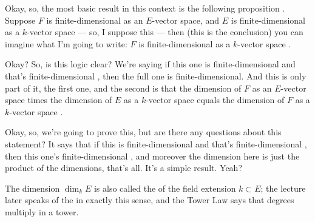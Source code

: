 \begin{speech}[00:21:52 - 00:23:42]
Okay, so, the most basic result in this context is the following proposition . Suppose $F$ is finite-dimensional as an $E$-vector space, and $E$ is finite-dimensional as a $k$-vector space --- so, I suppose this --- then (this is the conclusion) you can imagine what I'm going to write: $F$ is finite-dimensional as a $k$-vector space .

Okay? So, is this logic clear? We're saying if this one  is finite-dimensional and that's finite-dimensional , then the full one  is finite-dimensional. And this is only part of it, the first one, and the second is that the dimension of $F$ as an $E$-vector space times the dimension of $E$ as a $k$-vector space equals the dimension of $F$ as a $k$-vector space .

Okay, so, we're going to prove this, but are there any questions about this statement? It says that if this is finite-dimensional  and that's finite-dimensional , then this one's finite-dimensional , and moreover the dimension here is just the product of the dimensions, that's all. It's a simple result. Yeah?
\end{speech}

\begin{content}
The dimension $\dim_k E$ is also called the  of the field extension $k \subset E$; the lecture later speaks of the  in exactly this sense, and the Tower Law says that degrees multiply in a tower.
\end{content}


